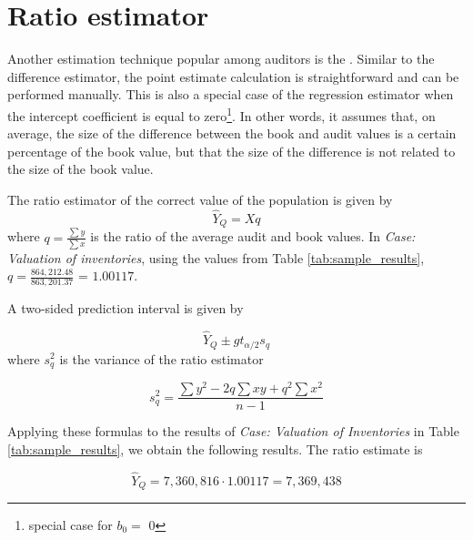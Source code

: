 
\section{Ratio estimator} %
\label{sec:ratio_estimator}

Another estimation technique popular among auditors is the . Similar to the difference estimator, the point estimate calculation is straightforward and can be performed manually. This is also a special case of the regression estimator when the intercept coefficient is equal to zero\footnote{special case for $b_0 = $ 0}. In other words, it assumes that, on average, the size of the difference between the book and audit values is a certain percentage of the book value, but that the size of the difference is not related to the size of the book value.

\bigskip
The ratio estimator of the correct value of the population is given by
\begin{equation}
\hat{Y}_Q = X q
\label{eq:ratio_estimator}
\end{equation}
where $q = \frac{\sum{y}}{\sum{x}}$ is the ratio of the average audit and book values. In \emph{Case: Valuation of inventories}, using the values from Table \ref{tab:sample_results}, $q = \frac{864,212.48}{863,201.37}$ = $1.00117$.

\bigskip
A two-sided prediction interval is given by

\begin{equation}
\hat{Y}_Q \pm g t_{\alpha/2} s_q
\label{eq:pred_interval_ratio}
\end{equation}
where $s_q^2$ is the variance of the ratio estimator

\begin{equation}
s_q^2 = \frac{\sum{y^2} - 2q\sum{xy} + q^2\sum{x^2}}{n - 1}
\label{eq:sd_ratios}
\end{equation}

\bigskip
Applying these formulas to the results of \emph{Case: Valuation of Inventories} in Table \ref{tab:sample_results}, we obtain the following results. The ratio estimate is

\begin{equation*}
\hat{Y}_Q = 7,360,816 \cdot 1.00117 = 7,369,438
\end{equation*}

